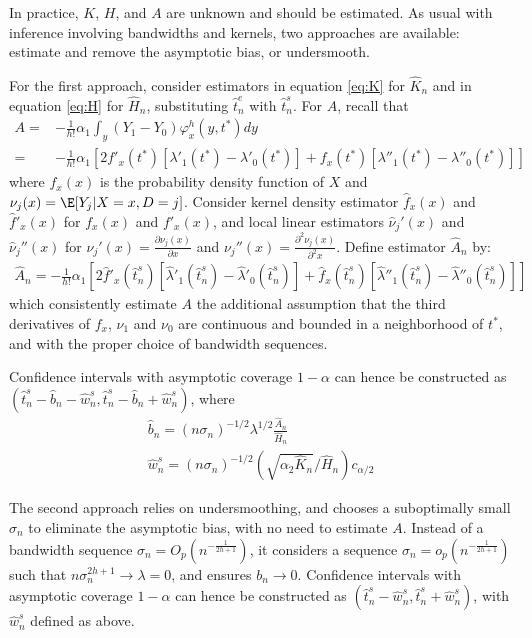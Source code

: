 {In practice, $K$, $H$, and $A$ are unknown and should be estimated. As usual with inference involving bandwidths and kernels, two approaches are available: estimate and remove the asymptotic bias, or undersmooth.

For the first approach, consider estimators in equation \eqref{eq:K} for $\hat{K}_n$ and in equation \eqref{eq:H} for $\hat{H}_n$, substituting $\hat{t}^e_n$ with $\hat{t}^s_n$. For $A$, recall that
\begin{align}
    A =& -\frac{1}{h!} \alpha_1 \int_y \left(Y_1 - Y_0 \right) \varphi^{h}_x(y,t^*) d y \\
    =& -\frac{1}{h!} \alpha_1 \left[ 2 f'_x(t^*)[\lambda'_1(t^*) - \lambda'_0(t^*)] +  f_x(t^*)[\lambda''_1(t^*) - \lambda''_0(t^*)] \right]
\end{align}
where $f_x(x)$ is the probability density function of $X$ and $\nu_j(x) = \E[Y_j|X=x,D=j]$. Consider kernel density estimator $\hat f_x(x)$ and $\hat f'_x(x)$ for $f_x(x)$ and $f'_x(x)$, and local linear estimators $\hat \nu_j'(x)$ and $\hat \nu_j''(x)$ for $\nu_j'(x) = \frac{\partial \nu_j(x)}{\partial x}$ and $\nu_j''(x) = \frac{\partial^2 \nu_j(x)}{\partial^2 x}$. Define estimator $\hat{A}_n$ by:
\begin{align}
    \hat{A}_n = -\frac{1}{h!} \alpha_1 \left[ 2 \hat f'_x(\hat{t}^s_n)[\hat \lambda'_1(\hat{t}^s_n) - \hat \lambda'_0(\hat{t}^s_n)] +  \hat f_x(\hat{t}^s_n)[\hat \lambda''_1(\hat{t}^s_n) - \hat \lambda''_0(\hat{t}^s_n)] \right]
\end{align}
which consistently estimate $A$ the additional assumption that the third derivatives of $f_x$, $\nu_1$ and $\nu_0$ are continuous and bounded in a neighborhood of $t^*$, and with the proper choice of bandwidth sequences.

Confidence intervals with asymptotic coverage $1- \alpha$ can hence be constructed as $(\hat{t}^s_n - \hat{b}_n - \hat{w}^s_n, \hat{t}^s_n - \hat{b}_n + \hat{w}^s_n) $, where
\begin{gather}
    \hat{b}_n = (n\sigma_n)^{-1/2} \lambda^{1/2} \frac{\hat{A}_n}{\hat{H}_n} \\
    \hat{w}^s_n = (n\sigma_n)^{-1/2} (\sqrt{\alpha_2 \hat{K}_n}/\hat{H}_n)c_{\alpha/2}
\end{gather}

The second approach relies on undersmoothing, and chooses a suboptimally small $\sigma_n$ to eliminate the asymptotic bias, with no need to estimate $A$. Instead of a bandwidth sequence $\sigma_n = O_p(n^{-\frac{1}{2h +1}})$, it considers a sequence $\sigma_n = o_p(n^{-\frac{1}{2h +1}})$ such that $n \sigma_n^{2h + 1} \rightarrow \lambda =0$, and ensures $b_n \to 0$. Confidence intervals with asymptotic coverage $1- \alpha$ can hence be constructed as $(\hat{t}^s_n - \hat{w}^s_n, \hat{t}^s_n + \hat{w}^s_n)$, with $\hat{w}^s_n$ defined as above.

}
